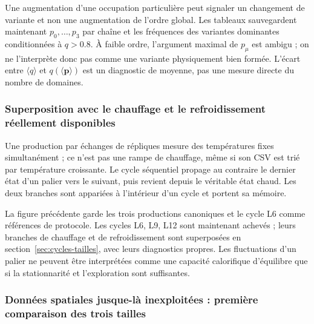 
Une augmentation d’une occupation particulière peut signaler un changement de variante et non une augmentation de l’ordre global. Les tableaux sauvegardent maintenant $p_0,\ldots,p_3$ par chaîne et les fréquences des variantes dominantes conditionnées à $q>0.8$. À faible ordre, l’argument maximal de $p_\mu$ est ambigu ; on ne l’interprète donc pas comme une variante physiquement bien formée. L’écart entre $\langle q\rangle$ et $q(\langle\mathbf p\rangle)$ est un diagnostic de moyenne, pas une mesure directe du nombre de domaines.

\subsubsection{Superposition avec le chauffage et le refroidissement réellement disponibles}


Une production par échanges de répliques mesure des températures fixes simultanément ; ce n’est pas une rampe de chauffage, même si son CSV est trié par température croissante. Le cycle séquentiel propage au contraire le dernier état d’un palier vers le suivant, puis revient depuis le véritable état chaud. Les deux branches sont appariées à l’intérieur d’un cycle et portent sa mémoire.

La figure précédente garde les trois productions canoniques et le cycle L6 comme références de protocole. Les cycles L6, L9, L12 sont maintenant achevés ; leurs branches de chauffage et de refroidissement sont superposées en section~\ref{sec:cycles-tailles}, avec leurs diagnostics propres. Les fluctuations d’un palier ne peuvent être interprétées comme une capacité calorifique d’équilibre que si la stationnarité et l’exploration sont suffisantes.

\subsubsection{Données spatiales jusque-là inexploitées : première comparaison des trois tailles}

